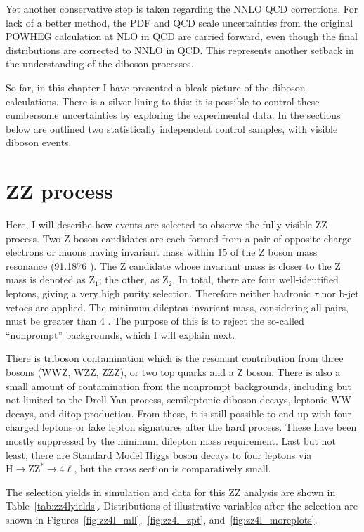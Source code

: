 Yet another conservative step is taken regarding the NNLO QCD corrections.
For lack of a better method, the PDF and QCD scale uncertainties from the original POWHEG calculation at NLO in QCD are carried forward,
even though the final distributions are corrected to NNLO in QCD.
This represents another setback in the understanding of the diboson processes.

So far, in this chapter I have presented a bleak picture of the diboson calculations.
There is a silver lining to this: it is possible to control these cumbersome uncertainties by exploring the experimental data.
In the sections below are outlined two statistically independent control samples, with visible diboson events.

\clearpage
\section{ZZ process}
\label{sec:zz4l}
Here, I will describe how events are selected to observe the fully visible ZZ process.
Two Z boson candidates are each formed from a pair of opposite-charge electrons or muons having invariant mass within 15 \GeV of the Z boson mass resonance (91.1876 \GeV).
The Z candidate whose invariant mass is closer to the Z mass is denoted as $\mathrm{Z}_1$; the other, as $\mathrm{Z}_2$.
In total, there are four well-identified leptons, giving a very high purity selection.
Therefore neither hadronic $\tau$ nor b-jet vetoes are applied.
The minimum dilepton invariant mass, considering all pairs, must be greater than 4 \GeV.
The purpose of this is to reject the so-called ``nonprompt'' backgrounds, which I will explain next.

There is triboson contamination which is the resonant contribution from three bosons (WWZ, WZZ, ZZZ), or two top quarks and a Z boson.
There is also a small amount of contamination from the nonprompt backgrounds,
including but not limited to the Drell-Yan process, semileptonic diboson decays, leptonic WW decays, and ditop production.
From these, it is still possible to end up with four charged leptons or fake lepton signatures after the hard process.
These have been mostly suppressed by the minimum dilepton mass requirement.
Last but not least, there are Standard Model Higgs boson decays to four leptons
via $\mathrm{H}\rightarrow \mathrm{ZZ^*} \rightarrow 4\ell$, 
but the cross section is comparatively small.

The selection yields in simulation and data for this ZZ analysis are shown in Table~\ref{tab:zz4lyields}.
Distributions of illustrative variables after the selection are shown in Figures~\ref{fig:zz4l_mll},~\ref{fig:zz4l_zpt}, and~\ref{fig:zz4l_moreplots}.

